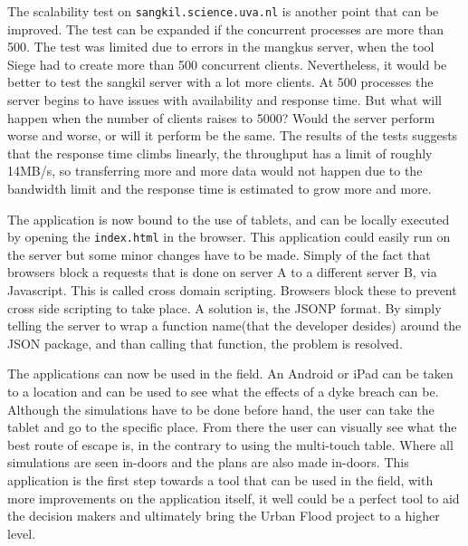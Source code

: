 The scalability test on \texttt{sangkil.science.uva.nl} is another point that can be improved. The test can be expanded if the concurrent processes are more than 500. The test was limited due to errors in the mangkus server, when the tool Siege had to create more than 500 concurrent clients. Nevertheless, it would be better to test the sangkil server with a lot more clients. At 500 processes the server begins to have issues with availability and response time. But what will happen when the number of clients raises to 5000? Would the server perform worse and worse, or will it perform be the same. The results of the tests suggests that the response time climbs linearly, the throughput has a limit of roughly 14MB/s, so transferring more and more data would not happen due to the bandwidth limit and the response time is estimated to grow more and more.

The application is now bound to the use of tablets, and can be locally executed by opening the \texttt{index.html} in the browser. This application could easily run on the server but some minor changes have to be made. Simply of the fact that browsers block a requests that is done on server A to a different server B, via Javascript. This is called cross domain scripting. Browsers block these to prevent cross side scripting to take place. A solution is, the JSONP\cite{jsonp} format. By simply telling the server to wrap a function name(that the developer desides) around the JSON package, and than calling that function, the problem is resolved.

The applications can now be used in the field. An Android or iPad can be taken to a location and can be used to see what the effects of a dyke breach can be. Although the simulations have to be done before hand, the user can take the tablet and go to the specific place. From there the user can visually see what the best route of escape is, in the contrary to using the multi-touch table. Where all simulations are seen in-doors and the plans are also made in-doors. This application is the first step towards a tool that can be used in the field, with more improvements on the application itself, it well could be a perfect tool to aid the decision makers and ultimately bring the Urban Flood project to a higher level.

